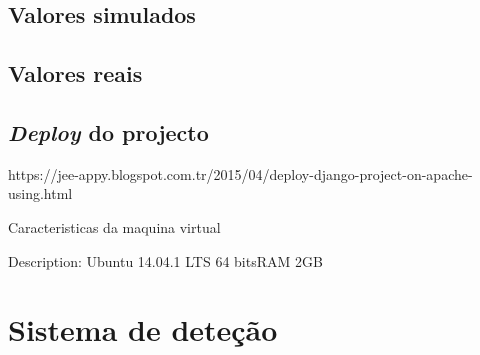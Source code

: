 \section{Valores simulados}

\section{Valores reais}



\section{\textit{Deploy} do projecto}


https://jee-appy.blogspot.com.tr/2015/04/deploy-django-project-on-apache-using.html

Caracteristicas da maquina virtual

Description:	Ubuntu 14.04.1 LTS
64 bitsRAM 2GB 






\chapter{Sistema de deteção}





